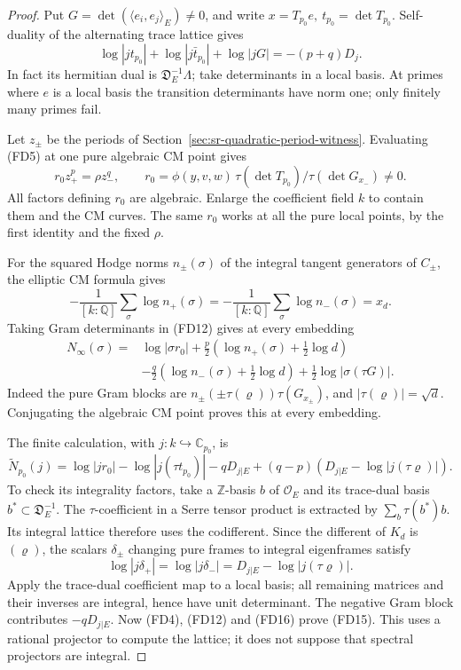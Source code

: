 \begin{proof}
Put \(G=\det(\langle e_i,e_j\rangle_E)\ne0\), and write
\(x=T_{p_0}e,\ t_{p_0}=\det T_{p_0}\).
Self-duality of the alternating trace lattice gives
\[
 \log|jt_{p_0}|+\log|j\bar t_{p_0}|+\log|jG|
                                    =-(p+q)D_j .
 \tag{FD11}
\]
In fact its hermitian dual is
\(\mathfrak D_E^{-1}\Lambda\); take determinants in a local
basis.  At primes where \(e\) is a local basis the transition
determinants have norm one; only finitely many primes fail.

Let \(z_\pm\) be the periods of
Section~\ref{sec:sr-quadratic-period-witness}.
Evaluating (FD5) at one pure algebraic CM point gives
\[
 r_0z_+^p=\rho z_-^q,\qquad
 r_0=\phi(y,v,w)\,
       \tau(\det T_{p_0})/\tau(\det G_{x_-})\ne0 .
 \tag{FD12}
\]
All factors defining \(r_0\) are algebraic.
Enlarge the coefficient field \(k\) to contain them and the
CM curves.  The same \(r_0\) works at all the pure local points,
by the first identity and the fixed \(\rho\).

For the squared Hodge norms \(n_\pm(\sigma)\) of the integral
tangent generators of \(C_\pm\), the elliptic CM formula gives
\[
 -\frac1{[k:\mathbb Q]}\sum_\sigma\log n_+(\sigma)
 =-\frac1{[k:\mathbb Q]}\sum_\sigma\log n_-(\sigma)=x_d .
 \tag{FD13}
\]
Taking Gram determinants in (FD12) gives at every embedding
\[
 \begin{split}
 N_\infty(\sigma)={}&\log|\sigma r_0|
 +\frac p2(\log n_+(\sigma)+\tfrac12\log d)\\
 &-\frac q2(\log n_-(\sigma)+\tfrac12\log d)
                              +\tfrac12\log|\sigma(\tau G)|.
 \end{split}
 \tag{FD14}
\]
Indeed the pure Gram blocks are
\(n_\pm(\pm\tau(\varrho))\tau(G_{x_\pm})\), and
\(|\tau(\varrho)|=\sqrt d\).
Conjugating the algebraic CM point proves this at every embedding.

The finite calculation, with \(j:k\hookrightarrow\mathbb C_{p_0}\),
is
\[
 \widetilde N_{p_0}(j)=\log|jr_0|-\log|j(\tau t_{p_0})|-qD_{j|E}
                 +(q-p)(D_{j|E}-\log|j(\tau\varrho)|).
 \tag{FD15}
\]
To check its integrality factors, take a \(\mathbb Z\)-basis
\(b\) of \(\mathcal O_E\) and its trace-dual basis
\(b^*\subset\mathfrak D_E^{-1}\).
The \(\tau\)-coefficient in a Serre tensor product is extracted
by \(\sum_b\tau(b^*)b\).  Its integral lattice therefore uses
the codifferent.
Since the different of \(K_d\) is \((\varrho)\), the scalars
\(\delta_\pm\) changing pure frames to integral eigenframes satisfy
\[
       \log|j\delta_+|=\log|j\delta_-|
                           =D_{j|E}-\log|j(\tau\varrho)|.
 \tag{FD16}
\]
Apply the trace-dual coefficient map to a local basis; all
remaining matrices and their inverses are integral, hence have
unit determinant.  The negative Gram block contributes
\(-qD_{j|E}\).
Now (FD4), (FD12) and (FD16) prove (FD15).
This uses a rational projector to compute the lattice; it does
not suppose that spectral projectors are integral.


\end{proof}

